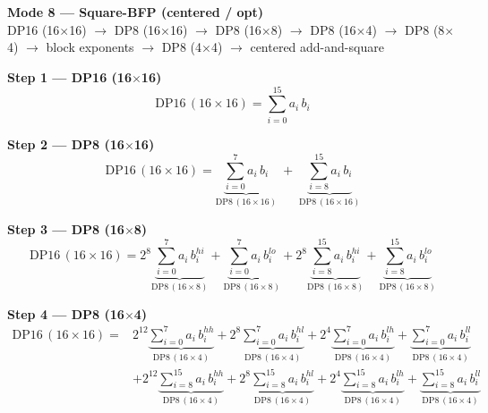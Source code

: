 \documentclass[fleqn]{article}
\newcommand{\DPop}[3]{\mathrm{DP#1}\,(#2\!\times\!#3)}
\begin{document}
\begin{center}
{\LARGE \textbf{Mode 8 --- Square-BFP (centered / opt)}}\\[4pt]
{\large DP16 (16$\times$16) $\rightarrow$ DP8 (16$\times$16) $\rightarrow$ DP8 (16$\times$8) $\rightarrow$ DP8 (16$\times$4) $\rightarrow$ DP8 (8$\times$4) $\rightarrow$ block exponents $\rightarrow$ DP8 (4$\times$4) $\rightarrow$ centered add-and-square}
\end{center}

\vspace{0.1em}

\textbf{Step 1 --- DP16 (16$\times$16)}
\[
\DPop{16}{16}{16} = \sum_{i=0}^{15} a_i \, b_i
\]

\textbf{Step 2 --- DP8 (16$\times$16)}
\[
\DPop{16}{16}{16}
  = \underbrace{\sum_{i=0}^{7} a_i \, b_i}_{\DPop{8}{16}{16}}
  \; + \; \underbrace{\sum_{i=8}^{15} a_i \, b_i}_{\DPop{8}{16}{16}}
\]

\textbf{Step 3 --- DP8 (16$\times$8)}
\[
\DPop{16}{16}{16}
  = 2^{8} \underbrace{\sum_{i=0}^{7} a_i \, b_i^{hi}}_{\DPop{8}{16}{8}}
  + \underbrace{\sum_{i=0}^{7} a_i \, b_i^{lo}}_{\DPop{8}{16}{8}}
  + 2^{8} \underbrace{\sum_{i=8}^{15} a_i \, b_i^{hi}}_{\DPop{8}{16}{8}}
  + \underbrace{\sum_{i=8}^{15} a_i \, b_i^{lo}}_{\DPop{8}{16}{8}}
\]

\textbf{Step 4 --- DP8 (16$\times$4)}
\begin{align*}
\DPop{16}{16}{16} = {}
  & 2^{12} \underbrace{\sum_{i=0}^{7} a_i \, b_i^{hh}}_{\DPop{8}{16}{4}}
  + 2^{8} \underbrace{\sum_{i=0}^{7} a_i \, b_i^{hl}}_{\DPop{8}{16}{4}}
  + 2^{4} \underbrace{\sum_{i=0}^{7} a_i \, b_i^{lh}}_{\DPop{8}{16}{4}}
  + \underbrace{\sum_{i=0}^{7} a_i \, b_i^{ll}}_{\DPop{8}{16}{4}} \\[1em]
  & + 2^{12} \underbrace{\sum_{i=8}^{15} a_i \, b_i^{hh}}_{\DPop{8}{16}{4}}
  + 2^{8} \underbrace{\sum_{i=8}^{15} a_i \, b_i^{hl}}_{\DPop{8}{16}{4}}
  + 2^{4} \underbrace{\sum_{i=8}^{15} a_i \, b_i^{lh}}_{\DPop{8}{16}{4}}
  + \underbrace{\sum_{i=8}^{15} a_i \, b_i^{ll}}_{\DPop{8}{16}{4}}
\end{align*}
\end{document}
